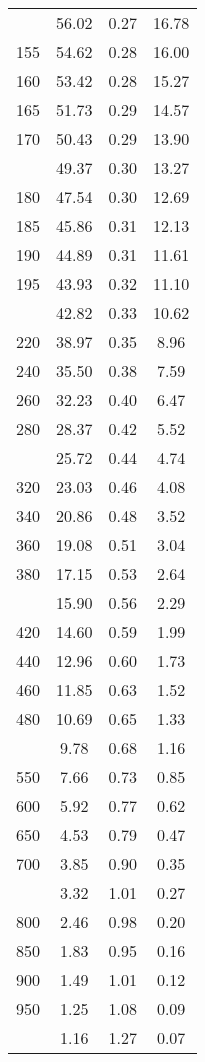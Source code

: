 \begin{table}[ht]
\begin{tabular}{lccc}
   \addlinespace
150 & 56.02 & 0.27 & 16.78 \\ 
  155 & 54.62 & 0.28 & 16.00 \\ 
  160 & 53.42 & 0.28 & 15.27 \\ 
  165 & 51.73 & 0.29 & 14.57 \\ 
  170 & 50.43 & 0.29 & 13.90 \\ 
   \addlinespace
175 & 49.37 & 0.30 & 13.27 \\ 
  180 & 47.54 & 0.30 & 12.69 \\ 
  185 & 45.86 & 0.31 & 12.13 \\ 
  190 & 44.89 & 0.31 & 11.61 \\ 
  195 & 43.93 & 0.32 & 11.10 \\ 
   \addlinespace
200 & 42.82 & 0.33 & 10.62 \\ 
  220 & 38.97 & 0.35 & 8.96 \\ 
  240 & 35.50 & 0.38 & 7.59 \\ 
  260 & 32.23 & 0.40 & 6.47 \\ 
  280 & 28.37 & 0.42 & 5.52 \\ 
   \addlinespace
300 & 25.72 & 0.44 & 4.74 \\ 
  320 & 23.03 & 0.46 & 4.08 \\ 
  340 & 20.86 & 0.48 & 3.52 \\ 
  360 & 19.08 & 0.51 & 3.04 \\ 
  380 & 17.15 & 0.53 & 2.64 \\ 
   \addlinespace
400 & 15.90 & 0.56 & 2.29 \\ 
  420 & 14.60 & 0.59 & 1.99 \\ 
  440 & 12.96 & 0.60 & 1.73 \\ 
  460 & 11.85 & 0.63 & 1.52 \\ 
  480 & 10.69 & 0.65 & 1.33 \\ 
   \addlinespace
500 & 9.78 & 0.68 & 1.16 \\ 
  550 & 7.66 & 0.73 & 0.85 \\ 
  600 & 5.92 & 0.77 & 0.62 \\ 
  650 & 4.53 & 0.79 & 0.47 \\ 
  700 & 3.85 & 0.90 & 0.35 \\ 
   \addlinespace
750 & 3.32 & 1.01 & 0.27 \\ 
  800 & 2.46 & 0.98 & 0.20 \\ 
  850 & 1.83 & 0.95 & 0.16 \\ 
  900 & 1.49 & 1.01 & 0.12 \\ 
  950 & 1.25 & 1.08 & 0.09 \\ 
   \addlinespace
1000 & 1.16 & 1.27 & 0.07 \\ 
   \bottomrule
\end{tabular}
\end{table}
